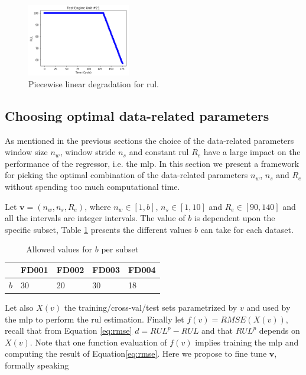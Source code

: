 \begin{figure}[!htb]
\centering
\includegraphics[width=0.4\textwidth]{img/piecewise_linear.png}
\caption{Piecewise linear degradation for \gls{rul}.}
\label{fig:piecewise_model}
\end{figure}

\subsection{Choosing optimal data-related parameters}
\label{sec:choosing_otimal_data-related_params}

As mentioned in the previous sections the choice of the data-related parameters window size $n_w$, window stride $n_s$ and constant \gls{rul} $R_e$ have a large impact on the performance of the regressor, i.e. the \gls{mlp}. In this section we present a framework for picking the optimal combination of the data-related parameters $n_w$, $n_s$ and $R_e$ without spending too much computational time.

Let $\mathbf{v} = (n_w, n_s, R_e)$, where $n_w \in \left[1, b\right]$, $n_s \in \left[1, 10\right]$ and $R_e \in \left[90, 140 \right]$ and all the intervals are integer intervals. The value of $b$ is dependent upon the specific subset, Table \ref{table:b_values} presents the different values $b$ can take for each dataset.

\begin{table}[!htb]
\centering
\begin{tabular}{l | l l l l}
	\hline
	 & FD001 & FD002 & FD003 & FD004\\
  	\hline
  	$b$ & 30 & 20 & 30 & 18\\
  	\hline
\end{tabular}
\caption{Allowed values for $b$ per subset}
\label{table:b_values}
\end{table}

Let also $X(v)$ the training/cross-val/test sets parametrized by $v$ and used by the \gls{mlp} to perform the \gls{rul} estimation. Finally let $f(v)=RMSE(X(v))$, recall that from Equation \ref{eq:rmse} $d = RUL^p - RUL$ and that $RUL^p$ depends on $X(v)$. Note that one function evaluation of $f(v)$ implies training the \gls{mlp} and computing the result of Equation\ref{eq:rmse}. Here we propose to fine tune $\mathbf{v}$, formally speaking

